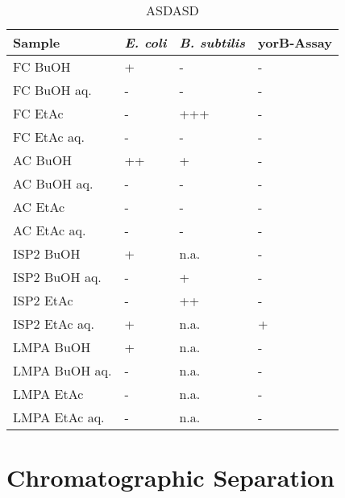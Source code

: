     \begin{table}[htbp]
        \caption{ASDASD}
        \label{tab:dddd}
        \centering
        \begin{tabularx}{\textwidth}{XXXX}
            \toprule
            \textbf{Sample} & \textbf{\textit{E. coli}}     & \textbf{\textit{B. subtilis}}  & \textbf{yorB-Assay}        \\
            \midrule
            FC BuOH         & +     & -     & -     \\
            FC BuOH aq.     & -     & -     & -     \\
            FC EtAc         & -     & +++   & -     \\
            FC EtAc aq.     & -     & -     & -     \\
            AC BuOH         & ++    & +     & -     \\
            AC BuOH aq.     & -     & -     & -     \\
            AC EtAc         & -     & -     & -     \\
            AC EtAc aq.     & -     & -     & -     \\
            ISP2 BuOH       & +     & n.a.  & -     \\
            ISP2 BuOH aq.   & -     & +     & -     \\
            ISP2 EtAc       & -     & ++    & -     \\
            ISP2 EtAc aq.   & +     & n.a.  & +     \\
            LMPA BuOH       & +     & n.a.  & -     \\
            LMPA BuOH aq.   & -     & n.a.  & -     \\
            LMPA EtAc       & -     & n.a.  & -     \\
            LMPA EtAc aq.   & -     & n.a.  & -     \\
            \bottomrule
        \end{tabularx}
    \end{table}


\section{Chromatographic Separation} %
\label{sec:chromatographic_separation}


